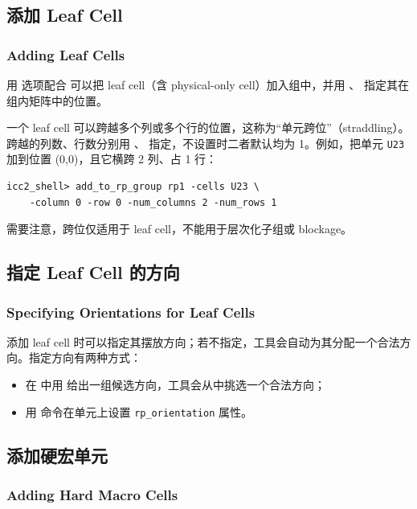 \subsection{添加 Leaf Cell}
\subsubsection*{Adding Leaf Cells}

用  选项配合  可以把 leaf cell（含 physical-only cell）加入组中，并用 、 指定其在组内矩阵中的位置。

一个 leaf cell 可以跨越多个列或多个行的位置，这称为“单元跨位”（straddling）。跨越的列数、行数分别用 、 指定，不设置时二者默认均为 1。例如，把单元 \texttt{U23} 加到位置 (0,0)，且它横跨 2 列、占 1 行：
\begin{lstlisting}
icc2_shell> add_to_rp_group rp1 -cells U23 \
    -column 0 -row 0 -num_columns 2 -num_rows 1
\end{lstlisting}

需要注意，跨位仅适用于 leaf cell，不能用于层次化子组或 blockage。

\subsection{指定 Leaf Cell 的方向}
\subsubsection*{Specifying Orientations for Leaf Cells}

添加 leaf cell 时可以指定其摆放方向；若不指定，工具会自动为其分配一个合法方向。指定方向有两种方式：
\begin{itemize}
  \item 在  中用  给出一组候选方向，工具会从中挑选一个合法方向；
  \item 用 \cmd{set\_attribute} 命令在单元上设置 \texttt{rp\_orientation} 属性。
\end{itemize}

\subsection{添加硬宏单元}
\subsubsection*{Adding Hard Macro Cells}

